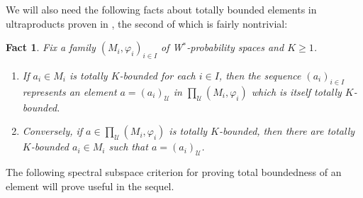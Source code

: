 \documentclass[12pt]{amsart}
\newtheorem{fact}[thm]{Fact}
\theoremstyle{definition}
\def\u{\mathsf 1}
\def \u{\mathcal U}
\begin{document}
We will also need the following facts about totally bounded elements in ultraproducts proven in \cite{AGHS25}, the second of which is fairly nontrivial:

\begin{fact}\label{TBelementsinultraproducts}
Fix a family $(M_i,\varphi_i)_{i\in I}$ of W$^*$-probability spaces and $K\geq 1$.
\begin{enumerate}
    \item If $a_i\in M_i$ is totally $K$-bounded for each $i\in I$, then the sequence $(a_i)_{i\in I}$ represents an element $a=(a_i)_\u$ in $\prod_\u (M_i,\varphi_i)$ which is itself totally $K$-bounded.
    \item Conversely, if $a\in \prod_\u (M_i,\varphi_i)$ is totally $K$-bounded, then there are totally $K$-bounded $a_i\in M_i$ such that $a=(a_i)_\u$.
\end{enumerate}
\end{fact}

The following spectral subspace criterion for proving total boundedness of an element will prove useful in the sequel.
\end{document}
